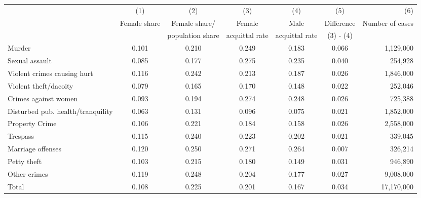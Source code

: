 {
\def\sym#1{\ifmmode^{#1}\else\(^{#1}\)\fi}
\begin{tabular}{lcccccr}
  \hline\hline
&\multicolumn{1}{c}{(1)}&\multicolumn{1}{c}{(2)}&\multicolumn{1}{c}{(3)}&\multicolumn{1}{c}{(4)}&\multicolumn{1}{c}{(5)}&\multicolumn{1}{r}{(6)}\\
&{Female share}&{Female share/}&{Female}&{Male} &  {Difference} & {Number of cases}\\
&{}&{population share}&{acquittal rate}&{acquittal rate} & {(3) - (4)} & {}\\
\hline
Murder & 0.101 & 0.210 & 0.249 & 0.183 & 0.066 & 1,129,000\\
Sexual assault & 0.085 & 0.177 & 0.275 & 0.235 & 0.040 & 254,928\\
Violent crimes causing hurt & 0.116 & 0.242 & 0.213 & 0.187 & 0.026 & 1,846,000\\
Violent theft/dacoity & 0.079 & 0.165 & 0.170 & 0.148 & 0.022 & 252,046\\
Crimes against women & 0.093 & 0.194 & 0.274 & 0.248 & 0.026 & 725,388\\
Disturbed pub. health/tranquility & 0.063 & 0.131 & 0.096 & 0.075 & 0.021 & 1,852,000\\
Property Crime & 0.106 & 0.221 & 0.184 & 0.158 & 0.026 & 2,558,000\\
Trespass & 0.115 & 0.240 & 0.223 & 0.202 & 0.021 & 339,045\\
Marriage offenses & 0.120 & 0.250 & 0.271 & 0.264 & 0.007 & 326,214\\
Petty theft & 0.103 & 0.215 & 0.180 & 0.149 & 0.031 & 946,890\\
Other crimes & 0.119 & 0.248 & 0.204 & 0.177 & 0.027 & 9,008,000\\
\hline
Total & 0.108 & 0.225 & 0.201 & 0.167 & 0.034 & 17,170,000\\
\hline\hline
\end{tabular}
}
